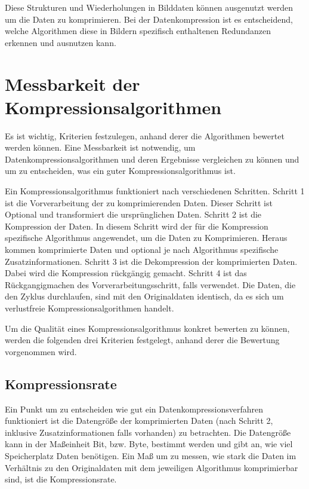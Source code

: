 \documentclass[conference]{IEEEtran}
\begin{document}
Diese Strukturen und Wiederholungen in Bilddaten können ausgenutzt werden um die
Daten zu komprimieren.
Bei der Datenkompression ist es entscheidend, welche Algorithmen diese in Bildern
spezifisch enthaltenen Redundanzen erkennen und ausnutzen kann.



\section{Messbarkeit der Kompressionsalgorithmen}

Es ist wichtig, Kriterien festzulegen, anhand derer die Algorithmen bewertet werden können.
Eine Messbarkeit ist notwendig, um Datenkompressionsalgorithmen und deren Ergebnisse
vergleichen zu können und um zu entscheiden, was ein guter Kompressionsalgorithmus ist.

Ein Kompressionsalgorithmus funktioniert nach verschiedenen Schritten.
Schritt 1 ist die Vorverarbeitung der zu komprimierenden Daten.
Dieser Schritt ist Optional und transformiert die ursprünglichen Daten.
Schritt 2 ist die Kompression der Daten.
In diesem Schritt wird der für die Kompression spezifische Algorithmus angewendet,
um die Daten zu Komprimieren.
Heraus kommen komprimierte Daten und optional je nach Algorithmus
spezifische Zusatzinformationen.
Schritt 3 ist die Dekompression der komprimierten Daten.
Dabei wird die Kompression rückgängig gemacht.
Schritt 4 ist das Rückgangigmachen des Vorverarbeitungsschritt, falls verwendet.
Die Daten, die den Zyklus durchlaufen, sind mit den Originaldaten identisch,
da es sich um verlustfreie Kompressionsalgorithmen handelt.

Um die Qualität eines Kompressionsalgorithmus konkret bewerten zu können, werden
die folgenden drei Kriterien festgelegt, anhand derer die Bewertung vorgenommen wird.

\subsection{Kompressionsrate}

Ein Punkt um zu entscheiden wie gut ein Datenkompressionsverfahren
funktioniert ist die Datengröße der komprimierten Daten (nach Schritt 2, inklusive
Zusatzinformationen falls vorhanden) zu betrachten.
Die Datengröße kann in der Maßeinheit Bit, bzw. Byte, bestimmt werden und gibt an,
wie viel Speicherplatz Daten benötigen.
Ein Maß um zu messen, wie stark die Daten im Verhältnis zu den Originaldaten mit dem
jeweiligen Algorithmus komprimierbar sind, ist die Kompressionsrate.
\end{document}
